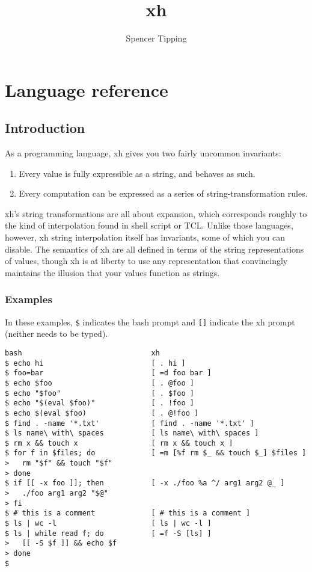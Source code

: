 \documentclass{report}
\title{xh}
\author{Spencer Tipping}
\begin{document}
\maketitle{}
\tableofcontents{}


\part{Language reference}\label{part:language-reference}
\chapter{Introduction}\label{chp:introduction}
  As a programming language, xh gives you two fairly uncommon invariants:

\begin{enumerate}
\item{Every value is fully expressible as a string, and behaves as such.}
       \label{item:values-are-strings}
\item{Every computation can be expressed as a series of}
       string-transformation rules.
       \label{item:computation-is-transformation}
\end{enumerate}

  xh's string transformations are all about expansion, which corresponds
  roughly to the kind of interpolation found in shell script or TCL. Unlike
  those languages, however, xh string interpolation itself has invariants, some
  of which you can disable. The semantics of xh are all defined in terms of the
  string representations of values, though xh is at liberty to use any
  representation that convincingly maintains the illusion that your values
  function as strings.

\section{Examples}\label{sec:examples}
    In these examples, \verb|$| indicates the bash prompt and \verb|[]|
    indicate the xh prompt (neither needs to be typed).

\begin{verbatim}
bash                              xh
$ echo hi                         [ . hi ]
$ foo=bar                         [ =d foo bar ]
$ echo $foo                       [ . @foo ]
$ echo "$foo"                     [ . $foo ]
$ echo "$(eval $foo)"             [ . !foo ]
$ echo $(eval $foo)               [ . @!foo ]
$ find . -name '*.txt'            [ find . -name '*.txt' ]
$ ls name\ with\ spaces           [ ls name\ with\ spaces ]
$ rm x && touch x                 [ rm x && touch x ]
$ for f in $files; do             [ =m [%f rm $_ && touch $_] $files ]
>   rm "$f" && touch "$f"
> done
$ if [[ -x foo ]]; then           [ -x ./foo %a ^/ arg1 arg2 @_ ]
>   ./foo arg1 arg2 "$@"
> fi
$ # this is a comment             [ # this is a comment ]
$ ls | wc -l                      [ ls | wc -l ]
$ ls | while read f; do           [ =f -S [ls] ]
>   [[ -S $f ]] && echo $f
> done
$
\end{verbatim}
\end{document}
